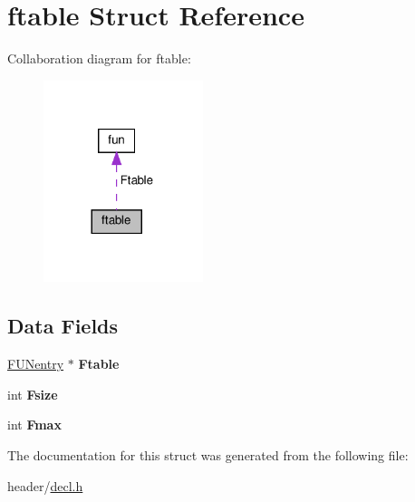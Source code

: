 \hypertarget{structftable}{}\section{ftable Struct Reference}
\label{structftable}


Collaboration diagram for ftable\+:\nopagebreak
\begin{figure}[H]
\begin{center}
\leavevmode
\includegraphics[width=132pt]{structftable__coll__graph}
\end{center}
\end{figure}
\subsection*{Data Fields}
\begin{DoxyCompactItemize}
\item 
\mbox{\label{structftable_aca10ea87e4ecbebc41fa08736c462197}} 
\hyperlink{structfun}{F\+U\+Nentry} $\ast$ {\bfseries Ftable}
\item 
\mbox{\label{structftable_a34c8933e3338d011fd77921cb34ddc61}} 
int {\bfseries Fsize}
\item 
\mbox{\label{structftable_a38b6b9aaf8c248ce4eee091119712693}} 
int {\bfseries Fmax}
\end{DoxyCompactItemize}


The documentation for this struct was generated from the following file\+:\begin{DoxyCompactItemize}
\item 
header/\hyperlink{decl_8h}{decl.\+h}\end{DoxyCompactItemize}
